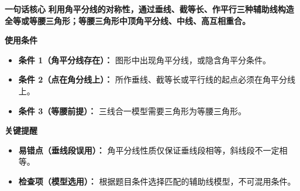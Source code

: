\begin{summarybox}
	\textbf{\textcolor{CSummary}{一句话核心}}
	\textbf{利用角平分线的对称性，通过垂线、截等长、作平行三种辅助线构造全等或等腰三角形；等腰三角形中顶角平分线、中线、高互相重合。}

	\medskip
	\textbf{\textcolor{CSummary}{使用条件}}
	\begin{itemize}[leftmargin=*, itemsep=0.5em, topsep=0.4em]
		\item \textbf{条件 1（角平分线存在）：} 图形中出现角平分线，或隐含角平分条件。
		\item \textbf{条件 2（点在角分线上）：} 所作垂线、截等长或平行线的起点必须在角平分线上。
		\item \textbf{条件 3（等腰前提）：} 三线合一模型需要三角形为等腰三角形。
	\end{itemize}

	\medskip
	\textbf{\textcolor{CSummary}{关键提醒}}
	\begin{itemize}[leftmargin=*, itemsep=0.5em, topsep=0.4em]
		\item \textbf{易错点（垂线段误用）：} 角平分线性质仅保证垂线段相等，斜线段不一定相等。
		\item \textbf{检查项（模型选用）：} 根据题目条件选择匹配的辅助线模型，不可混用条件。
	\end{itemize}

\end{summarybox}
